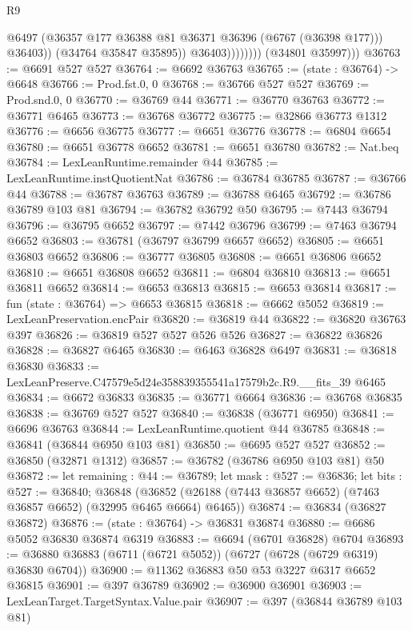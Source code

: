 \begin{lexlean}{R9}
\begin{coremodule}
                              @6497
                              (@36357 @177 @36388 @81 @36371 @36396 (@6767 (@36398 @177)))
                              @36403))
                          (@34764 @35847 @35895))
                        @36403))))))))
        (@34801 @35997)))
@36763 := @6691 @527 @527
@36764 := @6692 @36763
@36765 := (state : @36764) -> @6648
@36766 := Prod.fst.{0, 0}
@36768 := @36766 @527 @527
@36769 := Prod.snd.{0, 0}
@36770 := @36769 @44
@36771 := @36770 @36763
@36772 := @36771 @6465
@36773 := @36768 @36772
@36775 := @32866 @36773 @1312
@36776 := @6656 @36775
@36777 := @6651 @36776
@36778 := @6804 @6654
@36780 := @6651 @36778 @6652
@36781 := @6651 @36780
@36782 := Nat.beq
@36784 := LexLeanRuntime.remainder @44
@36785 := LexLeanRuntime.instQuotientNat
@36786 := @36784 @36785
@36787 := @36766 @44
@36788 := @36787 @36763
@36789 := @36788 @6465
@36792 := @36786 @36789 @103 @81
@36794 := @36782 @36792 @50
@36795 := @7443 @36794
@36796 := @36795 @6652
@36797 := @7442 @36796
@36799 := @7463 @36794 @6652
@36803 := @36781 (@36797 @36799 @6657 @6652)
@36805 := @6651 @36803 @6652
@36806 := @36777 @36805
@36808 := @6651 @36806 @6652
@36810 := @6651 @36808 @6652
@36811 := @6804 @36810
@36813 := @6651 @36811 @6652
@36814 := @6653 @36813
@36815 := @6653 @36814
@36817 := fun (state : @36764) => @6653 @36815
@36818 := @6662 @5052
@36819 := LexLeanPreservation.encPair
@36820 := @36819 @44
@36822 := @36820 @36763 @397
@36826 := @36819 @527 @527 @526 @526
@36827 := @36822 @36826
@36828 := @36827 @6465
@36830 := @6463 @36828 @6497
@36831 := @36818 @36830
@36833 := LexLeanPreserve.C47579e5d24e358839355541a17579b2c.R9.__fits_39 @6465
@36834 := @6672 @36833
@36835 := @36771 @6664
@36836 := @36768 @36835
@36838 := @36769 @527 @527
@36840 := @36838 (@36771 @6950)
@36841 := @6696 @36763
@36844 := LexLeanRuntime.quotient @44 @36785
@36848 := @36841 (@36844 @6950 @103 @81)
@36850 := @6695 @527 @527
@36852 := @36850 (@32871 @1312)
@36857 := @36782 (@36786 @6950 @103 @81) @50
@36872 := let remaining : @44 := @36789;
  let mask : @527 := @36836;
  let bits : @527 := @36840;
  @36848 (@36852 (@26188 (@7443 @36857 @6652) (@7463 @36857 @6652) (@32995 @6465 @6664) @6465))
@36874 := @36834 (@36827 @36872)
@36876 := (state : @36764) -> @36831 @36874
@36880 := @6686 @5052 @36830 @36874 @6319
@36883 := @6694 (@6701 @36828) @6704
@36893 := @36880 @36883 (@6711 (@6721 @5052)) (@6727 (@6728 (@6729 @6319) @36830 @6704))
@36900 := @11362 @36883 @50 @53 @3227 @6317 @6652 @36815
@36901 := @397 @36789
@36902 := @36900 @36901
@36903 := LexLeanTarget.TargetSyntax.Value.pair
@36907 := @397 (@36844 @36789 @103 @81)

\end{coremodule}
\end{lexlean}
